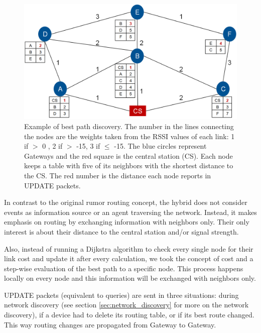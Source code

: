\begin{figure}
    \centering
    \includegraphics[width=15cm]{images/Example_Routing.png}
	\vspace{-1.5em}
    \caption[Best path discovery example]{Example of best path discovery. 
	The number in the lines connecting the nodes are the weights taken from the RSSI values of each link: 1 if \(>\) 0 , 2 if \(>\) -15, 3 if \(\leq\) -15.
	The blue circles represent Gateways and the red square is the central station (CS).
	Each node keeps a table with five of its neighbors with the shortest distance to the CS.
	The red number is the distance each node reports in UPDATE packets.}
    \vspace{-1.5em}
    \label{fig:routing}
\end{figure}

In contrast to the original rumor routing concept, the hybrid does not consider events as information source or an agent traversing the network. 
Instead, it makes emphasis on routing by exchanging information with neighbors only. 
Their only interest is about their distance to the central station and/or signal strength.

Also, instead of running a Dijkstra algorithm to check every single node for their link cost and update it after every calculation, we took the concept of cost and a step-wise evaluation of the best path to a specific node. 
This process happens locally on every node and this information will be exchanged with neighbors only. 

UPDATE packets (equivalent to queries) are sent in three situations: during network discovery (see section \ref{sec:network_discovery} for more on the network discovery), if a device had to delete its routing table, or if its best route changed. 
This way routing changes are propagated from Gateway to Gateway.